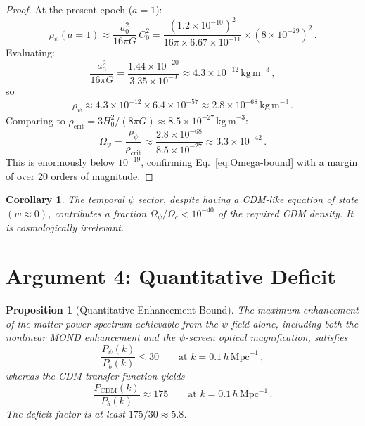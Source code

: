 \documentclass[12pt,a4paper]{article}
\newcommand{\hMpc}{\,h\,\mathrm{Mpc}^{-1}}
\newtheorem{proposition}[theorem]{Proposition}
\newtheorem{corollary}[theorem]{Corollary}
\begin{document}
\begin{proof}
At the present epoch ($a = 1$):
\begin{equation}
\rho_\psi(a=1) \approx \frac{a_0^2}{16\pi G}\,C_0^2
= \frac{(1.2\times 10^{-10})^2}{16\pi \times 6.67\times 10^{-11}}
\times (8\times 10^{-29})^2\,.
\end{equation}
Evaluating:
\begin{equation}
\frac{a_0^2}{16\pi G} = \frac{1.44\times 10^{-20}}{3.35\times 10^{-9}}
\approx 4.3\times 10^{-12}\,\mathrm{kg\,m}^{-3}\,,
\end{equation}
so
\begin{equation}
\rho_\psi \approx 4.3\times 10^{-12} \times 6.4\times 10^{-57}
\approx 2.8\times 10^{-68}\,\mathrm{kg\,m}^{-3}\,.
\end{equation}
Comparing to $\rho_{\mathrm{crit}} = 3H_0^2/(8\pi G)
\approx 8.5\times 10^{-27}\,\mathrm{kg\,m}^{-3}$:
\begin{equation}
\Omega_\psi = \frac{\rho_\psi}{\rho_{\mathrm{crit}}}
\approx \frac{2.8\times 10^{-68}}{8.5\times 10^{-27}}
\approx 3.3\times 10^{-42}\,.
\end{equation}
This is enormously below $10^{-19}$, confirming Eq.~\eqref{eq:Omega-bound}
with a margin of over 20 orders of magnitude.
\end{proof}

\begin{corollary}
The temporal $\psi$ sector, despite having a CDM-like equation of state
$(w \approx 0)$, contributes a fraction $\Omega_\psi/\Omega_c < 10^{-40}$
of the required CDM density. It is cosmologically irrelevant.
\end{corollary}

\section{Argument 4: Quantitative Deficit}
\label{sec:arg4}

\begin{proposition}[Quantitative Enhancement Bound]
\label{prop:quantitative}
The maximum enhancement of the matter power spectrum achievable from
the $\psi$ field alone, including both the nonlinear MOND enhancement
and the $\psi$-screen optical magnification, satisfies
\begin{equation}
\label{eq:deficit}
\frac{P_\psi(k)}{P_b(k)} \leq 30 \qquad
\text{at } k = 0.1\hMpc\,,
\end{equation}
whereas the CDM transfer function yields
\begin{equation}
\frac{P_{\mathrm{CDM}}(k)}{P_b(k)} \approx 175 \qquad
\text{at } k = 0.1\hMpc\,.
\end{equation}
The deficit factor is at least $175/30 \approx 5.8$.
\end{proposition}
\end{document}
